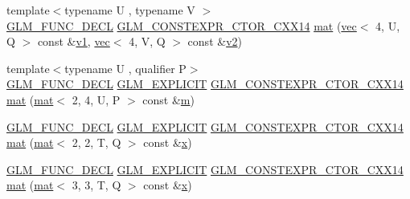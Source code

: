 \begin{DoxyCompactItemize}
\item 
{\footnotesize template$<$typename U , typename V $>$ }\\\hyperlink{setup_8hpp_ab2d052de21a70539923e9bcbf6e83a51}{G\+L\+M\+\_\+\+F\+U\+N\+C\+\_\+\+D\+E\+CL} \hyperlink{setup_8hpp_a0900f9145e68bf6061b6f5e7be3fa751}{G\+L\+M\+\_\+\+C\+O\+N\+S\+T\+E\+X\+P\+R\+\_\+\+C\+T\+O\+R\+\_\+\+C\+X\+X14} \hyperlink{structglm_1_1mat_3_012_00_014_00_01_t_00_01_q_01_4_aa3fa882e6b26c7fc035f8c17e17ff721}{mat} (\hyperlink{structglm_1_1vec}{vec}$<$ 4, U, Q $>$ const \&\hyperlink{_s_d_l__opengl__glext_8h_a435c176a02c061b43e19bdf7c86cceae}{v1}, \hyperlink{structglm_1_1vec}{vec}$<$ 4, V, Q $>$ const \&\hyperlink{_s_d_l__opengl__glext_8h_a0928f6d0f0f794ba000a21dfae422136}{v2})
\item 
{\footnotesize template$<$typename U , qualifier P$>$ }\\\hyperlink{setup_8hpp_ab2d052de21a70539923e9bcbf6e83a51}{G\+L\+M\+\_\+\+F\+U\+N\+C\+\_\+\+D\+E\+CL} \hyperlink{setup_8hpp_a6c74f5a5e7b134ab69023ff9a30d4d5d}{G\+L\+M\+\_\+\+E\+X\+P\+L\+I\+C\+IT} \hyperlink{setup_8hpp_a0900f9145e68bf6061b6f5e7be3fa751}{G\+L\+M\+\_\+\+C\+O\+N\+S\+T\+E\+X\+P\+R\+\_\+\+C\+T\+O\+R\+\_\+\+C\+X\+X14} \hyperlink{structglm_1_1mat_3_012_00_014_00_01_t_00_01_q_01_4_a9f8b14350b606e58d0bf69a7cd35bf45}{mat} (\hyperlink{structglm_1_1mat}{mat}$<$ 2, 4, U, P $>$ const \&\hyperlink{_s_d_l__opengl__glext_8h_af593500c283bf1a787a6f947f503a5c2}{m})
\item 
\hyperlink{setup_8hpp_ab2d052de21a70539923e9bcbf6e83a51}{G\+L\+M\+\_\+\+F\+U\+N\+C\+\_\+\+D\+E\+CL} \hyperlink{setup_8hpp_a6c74f5a5e7b134ab69023ff9a30d4d5d}{G\+L\+M\+\_\+\+E\+X\+P\+L\+I\+C\+IT} \hyperlink{setup_8hpp_a0900f9145e68bf6061b6f5e7be3fa751}{G\+L\+M\+\_\+\+C\+O\+N\+S\+T\+E\+X\+P\+R\+\_\+\+C\+T\+O\+R\+\_\+\+C\+X\+X14} \hyperlink{structglm_1_1mat_3_012_00_014_00_01_t_00_01_q_01_4_a1248b3992782f755da5abbcd9ee09d0b}{mat} (\hyperlink{structglm_1_1mat}{mat}$<$ 2, 2, T, Q $>$ const \&\hyperlink{_s_d_l__opengl_8h_ad0e63d0edcdbd3d79554076bf309fd47}{x})
\item 
\hyperlink{setup_8hpp_ab2d052de21a70539923e9bcbf6e83a51}{G\+L\+M\+\_\+\+F\+U\+N\+C\+\_\+\+D\+E\+CL} \hyperlink{setup_8hpp_a6c74f5a5e7b134ab69023ff9a30d4d5d}{G\+L\+M\+\_\+\+E\+X\+P\+L\+I\+C\+IT} \hyperlink{setup_8hpp_a0900f9145e68bf6061b6f5e7be3fa751}{G\+L\+M\+\_\+\+C\+O\+N\+S\+T\+E\+X\+P\+R\+\_\+\+C\+T\+O\+R\+\_\+\+C\+X\+X14} \hyperlink{structglm_1_1mat_3_012_00_014_00_01_t_00_01_q_01_4_a7ff54549fe4e95e2d8b09f096bd80f13}{mat} (\hyperlink{structglm_1_1mat}{mat}$<$ 3, 3, T, Q $>$ const \&\hyperlink{_s_d_l__opengl_8h_ad0e63d0edcdbd3d79554076bf309fd47}{x})

\end{DoxyCompactItemize}

